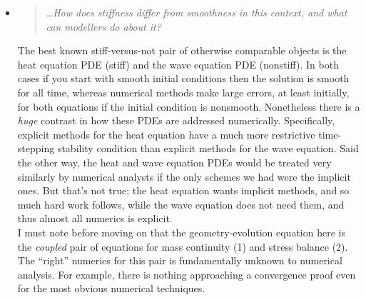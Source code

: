 \documentclass[11pt,reqno]{amsart}
\newcommand{\reply}[2]{
\medskip\medskip
\item  \begin{quote}
\emph{#1}
\end{quote}

\medskip
\noindent #2}
\begin{document}
\begin{itemize}
\reply{\dots How does stiffness differ from smoothness in this context, and what can modellers do about it?}
{The best known stiff-versus-not pair of otherwise comparable objects is the heat equation PDE (stiff) and the wave equation PDE (nonstiff).  In both cases if you start with smooth initial conditions then the solution is smooth for all time, whereas numerical methods make large errors, at least initially, for both equations if the initial condition is nonsmooth.  Nonetheless there is a \emph{huge} contrast in how these PDEs are addressed numerically.   Specifically, explicit methods for the heat equation have a much more restrictive time-stepping stability condition than explicit methods for the wave equation.  Said the other way, the heat and wave equation PDEs would be treated very similarly by numerical analysts if the only schemes we had were the implicit ones.  But that's not true; the heat equation wants implicit methods, and so much hard work follows, while the wave equation does not need them, and thus almost all numerics is explicit. \medskip \\
I must note before moving on that the geometry-evolution equation here is the \emph{coupled} pair of equations for mass continuity (1) and stress balance (2).  The ``right'' numerics for this pair is fundamentally unknown to numerical analysis.  For example, there is nothing approaching a convergence proof even for the most obvious numerical techniques.}


\end{itemize}
\end{document}
